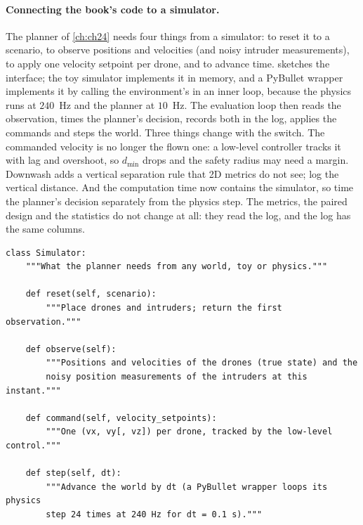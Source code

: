 \paragraph{Connecting the book's code to a simulator.}
The planner of \cref{ch:ch24} needs four things from a simulator: to reset
it to a scenario, to observe positions and velocities (and noisy intruder
measurements), to apply one velocity setpoint per drone, and to advance
time.  sketches the interface; the toy simulator
implements it in memory, and a PyBullet wrapper implements it by calling
the environment's  in an inner loop, because the physics runs
at $240$~Hz and the planner at $10$~Hz. The evaluation loop then reads the
observation, times the planner's decision, records both in the log, applies
the commands and steps the world. Three things change with the switch. The
commanded velocity is no longer the flown one: a low-level controller
tracks it with lag and overshoot, so $d_{\min}$ drops and the safety radius
may need a margin. Downwash adds a vertical separation rule that 2D metrics
do not see; log the vertical distance. And the computation time now contains
the simulator, so time the planner's decision separately from the physics
step. The metrics, the paired design and the statistics do not change at
all: they read the log, and the log has the same columns.

\begin{lstlisting}[caption={Interface between the evaluation loop and a simulator (a sketch, not part of \code{ch25\_evaluation.py}). The toy simulator and a PyBullet wrapper both fit it; the loop and the metrics never see the difference.},label={lst:ch25-simulator}]
class Simulator:
    """What the planner needs from any world, toy or physics."""

    def reset(self, scenario):
        """Place drones and intruders; return the first observation."""

    def observe(self):
        """Positions and velocities of the drones (true state) and the
        noisy position measurements of the intruders at this instant."""

    def command(self, velocity_setpoints):
        """One (vx, vy[, vz]) per drone, tracked by the low-level control."""

    def step(self, dt):
        """Advance the world by dt (a PyBullet wrapper loops its physics
        step 24 times at 240 Hz for dt = 0.1 s)."""
\end{lstlisting}

